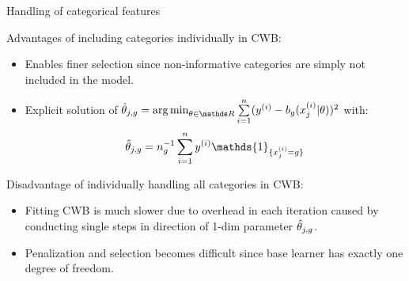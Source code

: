 \documentclass[11pt,compress,t,notes=noshow, xcolor=table]{beamer}
\begin{document}
\begin{vbframe}{Handling of categorical features}
\framebreak

Advantages of including categories individually in CWB: 
\begin{itemize}
    \item 
        Enables finer selection since non-informative categories are simply not included in the model. %

    \item 
        Explicit solution of $\thetah_{j,g} = \argmin_{\theta\in\R}\sumin (\yi - b_g(x^{(i)}_j|\theta))^2$ with:
        $$\thetah_{j,g} = n_g^{-1}\sumin \yi \mathds{1}_{\{x^{(i)}_j = g\}}$$
\end{itemize}

Disadvantage of individually handling all categories in CWB:
\begin{itemize}
    \item 
        Fitting CWB is much slower due to overhead in each iteration %
        caused by conducting single steps in direction of 1-dim parameter $\hat{\theta}_{j,g}$.

    \item 
        Penalization and selection becomes difficult since base learner has exactly one degree of freedom.
\end{itemize}

\end{vbframe}

\end{document}
